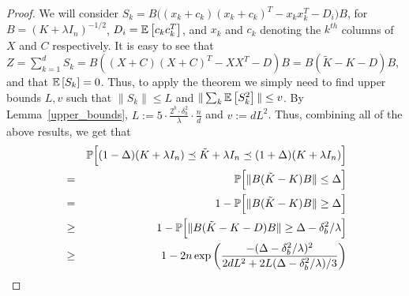 \documentclass[12pt]{article}
\newcommand{\tK}{\tilde{K}}
\newcommand{\defeq}{:=}
\begin{document}
\begin{proof}
We will consider $S_k = B\Big((x_k + c_k)(x_k + c_k)^T  - x_k x_k^T - D_i\Big)B$, for $B=(K+\lambda I_n)^{-1/2}$, $D_i = \expect{}{c_k c_k^T}$, and $x_k$ and $c_k$ denoting the $k^{th}$ columns of $X$ and $C$ respectively.  It is easy to see that $Z=\sum_{k=1}^d S_k = B((X+C)(X+C)^T - XX^T - D)B = B(\tK - K - D)B$, and that $\expect{}{S_k} = 0$.  Thus, to apply the theorem we simply need to find upper bounds $L,v$ such that $\|S_k\| \leq L$ and $\|\sum_k\expect{}{S_k^2}\|\leq v$.  By Lemma~\ref{upper_bounds}, $L \defeq 5 \cdot \frac{2^b \cdot \delta_b^2}{\lambda}\cdot  \frac{n}{d}$ and $v \defeq dL^2$.  Thus, combining all of the above results, we get that
\begin{eqnarray*}
&&\Prob\Big[(1 - \Delta) (K + \lambda I_n) \preceq \tK + \lambda I_n \preceq (1 + \Delta) (K + \lambda I_n)
\Big] \\ &=& \Prob\Big[ \|B (\tK - K) B\| \leq \Delta\Big] \\
&=& 1 - \Prob\Big[ \|B (\tK - K) B\| \geq \Delta\Big] \\
&\geq& 1 - \Prob\Big[ \|B (\tK - K - D) B\| \geq \Delta-\delta_b^2/\lambda\Big] \\
&\geq& 1 - 2n \exp \bigg(\frac{-(\Delta-\delta_b^2/\lambda)^2}{2dL^2 + 2L(\Delta-\delta_b^2/\lambda)/3}\bigg)
\end{eqnarray*}
\end{proof}
\end{document}
